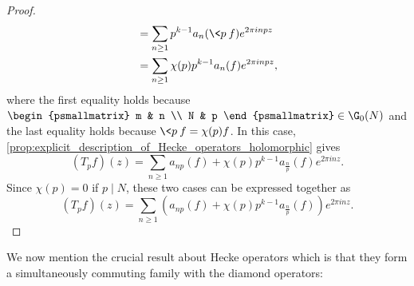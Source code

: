 \begin{proof}
\begin{align*}
        &= \sum_{n \ge 1}p^{k-1}a_{n}(\<p\>f)e^{2\pi inpz} \\
        &= \sum_{n \ge 1}\chi(p)p^{k-1}a_{n}(f)e^{2\pi inpz},
      \end{align*}
      where the first equality holds because $\begin{psmallmatrix} m & n \\ N & p \end{psmallmatrix} \in \G_{0}(N)$ and the last equality holds because $\<p\>f = \chi(p)f$. In this case, \cref{prop:explicit_description_of_Hecke_operators_holomorphic} gives
      \[
        (T_{p}f)(z) = \sum_{n \ge 1}a_{np}(f)+\chi(p)p^{k-1}a_{\frac{n}{p}}(f)e^{2\pi inz}.
      \]
      Since $\chi(p) = 0$ if $p \mid N$, these two cases can be expressed together as 
      \[
        (T_{p}f)(z) = \sum_{n \ge 1}\left(a_{np}(f)+\chi(p)p^{k-1}a_{\frac{n}{p}}(f)\right)e^{2\pi inz}.
      \]
    \end{proof}

    We now mention the crucial result about Hecke operators which is that they form a simultaneously commuting family with the diamond operators:


